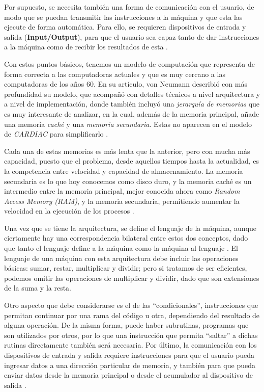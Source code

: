 \documentclass[letterpaper,12pt,oneside]{book}
\begin{document}
		Por supuesto, se necesita también una forma de comunicación con el usuario, de modo que se puedan transmitir las instrucciones a la máquina
		y que esta las ejecute de forma automática. Para ello, se requieren dispositivos de entrada y salida (\textbf{Input/Output}), para que
		el usuario sea capaz tanto de dar instrucciones a la máquina como de recibir los resultados de esta \cite{von_neumann_papers_1987}.
		
		Con estos puntos básicos, tenemos un modelo de computación que representa de forma correcta a las computadoras actuales y que es muy cercano
		a las computadoras de los años 60. En su artículo, von Neumann describió con más profundidad su modelo, que acompañó con detalles técnicos
		a nivel arquitectura y a nivel de implementación, donde también incluyó una 
		\textit{jerarquía de memorias} que es muy interesante de analizar, en la cual, además de la memoria principal, añade una memoria 
		\textit{caché} y una \textit{memoria secundaria}. Estas no aparecen en el modelo de \textit{CARDIAC} para simplificarlo \cite{von_neumann_papers_1987}.

		Cada una de estas memorias es más lenta que la anterior, pero con mucha más capacidad, puesto que el problema, desde aquellos tiempos hasta la actualidad,
		es la competencia entre velocidad y capacidad de almacenamiento. La memoria secundaria es lo que hoy conocemos como disco 
		duro, y la memoria caché es un intermedio entre la memoria principal, mejor conocida ahora como \textit{Random Access Memory (RAM)}, y la memoria secundaria, permitiendo aumentar la velocidad en la
		ejecución de los procesos \cite{von_neumann_papers_1987}.
		
		
		Una vez que se tiene la arquitectura, se define el lenguaje de la máquina, aunque ciertamente hay una correspondencia bilateral entre estos
		dos conceptos, dado que tanto el lenguaje define a la máquina como la máquina al lenguaje \cite{tanenbaum_structured_2013}. El
		lenguaje de una máquina con esta arquitectura debe incluir las operaciones básicas: sumar, restar, multiplicar y dividir; pero
		si tratamos de ser eficientes, podemos omitir las operaciones de multiplicar y dividir, dado que son extensiones de la suma y la resta.

		Otro
		aspecto que debe considerarse es el de las ``condicionales'', instrucciones que permitan continuar por una rama del código u otra,
		dependiendo del resultado de alguna operación. De la misma forma, puede haber subrutinas, programas que son utilizados por otros,
	por lo
		que una instrucción que permita ``saltar'' a dichas rutinas directamente también será necesaria. Por último, la comunicación con los dispositivos
		de entrada y salida requiere instrucciones para que el usuario pueda ingresar datos a una dirección particular de memoria, y también para que
		pueda enviar datos desde la memoria principal o desde el acumulador al dispositivo de salida \cite{von_neumann_papers_1987}.
		
\end{document}
